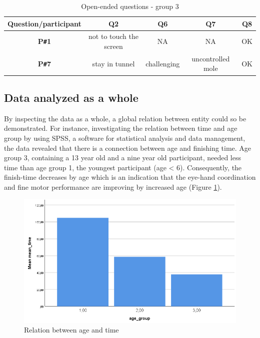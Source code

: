 \begin{table}[!ht]
    \centering
    \begin{tabular}{c|c|c|c|c}
    \hline
    \multicolumn{1}{|c|}{\textbf{Question/participant}} &
    \multicolumn{1}{c|}{\textbf{Q2}} &
    \multicolumn{1}{c|}{\textbf{Q6}} &
    \multicolumn{1}{c|}{\textbf{Q7}} &
    \multicolumn{1}{c|}{\textbf{Q8}} \\ \hline
    \multicolumn{1}{|c|}{\textbf{P\texttt{\#}1}} &
    \multicolumn{1}{c|}{not to touch the screen} &
    \multicolumn{1}{c|}{NA} &
    \multicolumn{1}{c|}{NA} &
    \multicolumn{1}{c|}{OK} \\ \hline
    \multicolumn{1}{|c|}{\textbf{P\texttt{\#}7}} &
    \multicolumn{1}{c|}{stay in tunnel} &
    \multicolumn{1}{c|}{challenging} &
    \multicolumn{1}{c|}{uncontrolled mole} &
    \multicolumn{1}{c|}{OK} \\ \hline
    \end{tabular}
    \caption{Open-ended questions - group 3}
    \label{tab:openendedquestiongroup3}
\end{table}


\subsection{Data analyzed as a whole}
By inspecting the data as a whole, a global relation between entity could so be demonstrated. For instance, investigating the relation between time and age group by using SPSS, a software for statistical analysis and data management, the data revealed that there is a connection between age and finishing time. Age group 3, containing a 13 year old and a nine year old participant, needed less time than age group 1, the youngest participant (age < 6). Consequently, the finish-time decreases by age which is an indication that the eye-hand coordination and fine motor performance are improving by increased age (Figure \ref{fig:relationTimeAge}).

\begin{figure}[!ht]
    \centering
    \includegraphics[width=.6\textwidth]{figures/relationTimeAge.png}
    \caption{Relation between age and time}
    \label{fig:relationTimeAge}
\end{figure}

